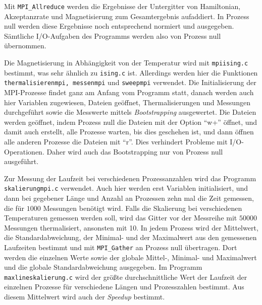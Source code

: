 	Mit \texttt{MPI\_Allreduce} werden die Ergebnisse der Untergitter von Hamiltonian, Akzeptanzrate und Magnetisierung zum Gesamtergebnis aufaddiert. In Prozess null werden diese Ergebnisse noch entsprechend normiert und ausgegeben. Sämtliche I/O-Aufgaben des Programms werden also von Prozess null übernommen.
	
	Die Magnetisierung in Abhängigkeit von der Temperatur wird mit \texttt{mpiising.c} bestimmt, was sehr ähnlich zu \texttt{ising.c} ist. Allerdings werden hier die Funktionen \texttt{thermalisierenmpi, messenmpi} und \texttt{sweepmpi} verwendet. 
	Die Initialisierung der MPI-Prozesse findet ganz am Anfang vom Programm statt, danach werden auch hier Variablen zugewiesen, Dateien geöffnet, Thermalisierungen und Messungen durchgeführt sowie die Messwerte mittels \textit{Bootstrapping} ausgewertet. Die Dateien werden geöffnet, indem Prozess null die Dateien mit der Option \enquote{w+} öffnet, und damit auch erstellt, alle Prozesse warten, bis dies geschehen ist, und dann öffnen alle anderen Prozesse die Dateien mit \enquote{r}. Dies verhindert Probleme mit I/O-Operationen. Daher wird auch das Bootstrapping nur von Prozess null ausgeführt.
	
	Zur Messung der Laufzeit bei verschiedenen Prozessanzahlen wird das Programm \texttt{skalierungmpi.c} verwendet. Auch hier werden erst Variablen initialisiert, und dann bei gegebener Länge und Anzahl an Prozessen zehn mal die Zeit gemessen, die für $1000$ Messungen benötigt wird. Falls die Skalierung bei verschiedenen Temperaturen gemessen werden soll, wird das Gitter vor der Messreihe mit $50000$ Messungen thermalisiert, ansonsten mit 10. In jedem Prozess wird der Mittelwert, die Standardabweichung, der Minimal- und der Maximalwert aus den gemessenen Laufzeiten bestimmt und mit \texttt{MPI\_Gather} an Prozess null übertragen. Dort werden die einzelnen Werte sowie der globale Mittel-, Minimal- und Maximalwert und die globale Standardabweichung ausgegeben. Im Programm \texttt{maxlineskalierung.c} wird der größte durchschnittliche Wert der Laufzeit der einzelnen Prozesse für verschiedene Längen und Prozesszahlen bestimmt. Aus diesem Mittelwert wird auch der \textit{Speedup} bestimmt.  
%	



